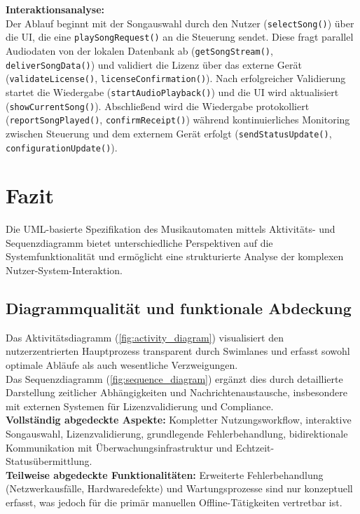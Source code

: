 \documentclass[12pt,oneside]{article}
\begin{document}
\textbf{Interaktionsanalyse:}\\
Der Ablauf beginnt mit der Songauswahl durch den Nutzer (\texttt{selectSong()}) über die UI, die eine \texttt{playSongRequest()} an die Steuerung sendet. Diese fragt parallel Audiodaten von der lokalen Datenbank ab (\texttt{getSongStream()}, \texttt{deliverSongData()}) und validiert die Lizenz über das externe Gerät (\texttt{validateLicense()}, \texttt{licenseConfirmation()}). Nach erfolgreicher Validierung startet die Wiedergabe (\texttt{startAudioPlayback()}) und die UI wird aktualisiert (\texttt{showCurrentSong()}). Abschließend wird die Wiedergabe protokolliert (\texttt{reportSongPlayed()}, \texttt{confirmReceipt()}) während kontinuierliches Monitoring zwischen Steuerung und dem externem Gerät erfolgt (\texttt{sendStatusUpdate()}, \texttt{configurationUpdate()}).

\section{Fazit} \label{sec:fazit}

Die UML-basierte Spezifikation des Musikautomaten mittels Aktivitäts- und Sequenzdiagramm bietet unterschiedliche Perspektiven auf die Systemfunktionalität und ermöglicht eine strukturierte Analyse der komplexen Nutzer-System-Interaktion.

\subsection{Diagrammqualität und funktionale Abdeckung}

Das Aktivitätsdiagramm (\ref{fig:activity_diagram}) visualisiert den nutzerzentrierten Hauptprozess transparent durch Swimlanes und erfasst sowohl optimale Abläufe als auch wesentliche Verzweigungen. \\
Das Sequenzdiagramm (\ref{fig:sequence_diagram}) ergänzt dies durch detaillierte Darstellung zeitlicher Abhängigkeiten und Nachrichtenaustausche, insbesondere mit externen Systemen für Lizenzvalidierung und Compliance.\\
\textbf{Vollständig abgedeckte Aspekte:}
Kompletter Nutzungsworkflow, interaktive Songauswahl, Lizenzvalidierung, grundlegende Fehlerbehandlung, bidirektionale Kommunikation mit Überwachungsinfrastruktur und Echtzeit-Statusübermittlung.\\
\textbf{Teilweise abgedeckte Funktionalitäten:}
Erweiterte Fehlerbehandlung (Netzwerkausfälle, Hardwaredefekte) und Wartungsprozesse sind nur konzeptuell erfasst, was jedoch für die primär manuellen Offline-Tätigkeiten vertretbar ist.
\end{document}
